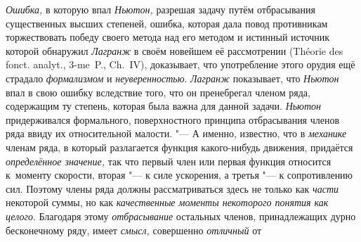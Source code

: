 {\em Ошибка,} в которую впал {\em Ньютон,} разрешая задачу путём отбрасывания
существенных высших степеней, ошибка, которая дала повод противникам
торжествовать победу своего метода над его методом и истинный источник которой
обнаружил {\em Лагранж} в своём новейшем её рассмотрении (Thé\-orie des fonct.
analyt., 3-me~P., Ch.~IV), доказывает, что употребление этого орудия ещё
страдало {\em формализмом} и {\em неуверенностью}. {\em Лагранж} показывает,
что {\em Ньютон} впал в свою ошибку вследствие того, что он пренебрегал членом
ряда, содержащим ту степень, которая была важна для данной задачи. {\em Ньютон}
придерживался формального, поверхностного принципа отбрасывания членов ряда ввиду
их относительной малости. "--- А именно, известно, что в {\em механике} членам
ряда, в который разлагается функция какого-нибудь движения, придаётся
{\em определённое значение,} так что первый член или первая функция относится
к~моменту скорости, вторая "--- к силе ускорения, а третья "--- к сопротивлению
сил. Поэтому члены ряда должны рассматриваться здесь не только как {\em части}
некоторой суммы, но как {\em качественные моменты некоторого понятия как целого}.
Благодаря этому {\em отбрасывание} остальных членов, принадлежащих
дурно бесконечному ряду, имеет {\em смысл,} совершенно {\em отличный} от
